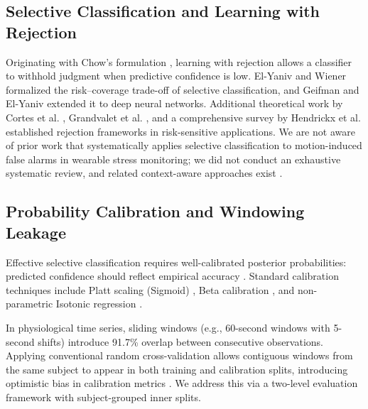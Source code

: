 \documentclass[conference]{IEEEtran}
\begin{document}
\subsection{Selective Classification and Learning with Rejection}
Originating with Chow's formulation \cite{chow1970optimum}, learning with rejection allows a classifier to withhold judgment when predictive confidence is low. El-Yaniv and Wiener \cite{elyaniv2010foundations} formalized the risk--coverage trade-off of selective classification, and Geifman and El-Yaniv \cite{geifman2017selective, geifman2019selectivenet} extended it to deep neural networks. Additional theoretical work by Cortes et al. \cite{cortes2016learning}, Grandvalet et al. \cite{grandvalet2008support}, and a comprehensive survey by Hendrickx et al. \cite{hendrickx2024machine} established rejection frameworks in risk-sensitive applications. We are not aware of prior work that systematically applies selective classification to motion-induced false alarms in wearable stress monitoring; we did not conduct an exhaustive systematic review, and related context-aware approaches exist \cite{gjoreski2017monitoring}.

\subsection{Probability Calibration and Windowing Leakage}
Effective selective classification requires well-calibrated posterior probabilities: predicted confidence should reflect empirical accuracy \cite{guo2017calibration, naeini2015obtaining}. Standard calibration techniques include Platt scaling (Sigmoid) \cite{platt1999probabilistic}, Beta calibration \cite{kull2017beta}, and non-parametric Isotonic regression \cite{zadrozny2002transforming, niculescu2005predicting}.

In physiological time series, sliding windows (e.g., 60-second windows with 5-second shifts) introduce 91.7\% overlap between consecutive observations. Applying conventional random cross-validation allows contiguous windows from the same subject to appear in both training and calibration splits, introducing optimistic bias in calibration metrics \cite{saeb2017need, little2017using}. We address this via a two-level evaluation framework with subject-grouped inner splits.
\end{document}
